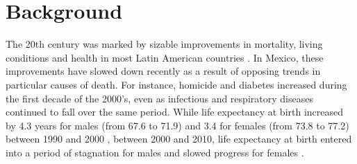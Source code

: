 \documentclass{bmcart}
\begin{document}
\begin{frontmatter}
\begin{abstractbox}

\begin{keyword}
\end{keyword}


\end{abstractbox}
%

\end{frontmatter}




\section*{Background}
The 20th century was marked by sizable improvements in mortality, living
conditions and health in most Latin American countries \cite{who2000}. 
In Mexico, these improvements have slowed down recently as a result of opposing
trends in particular causes of death. For instance, homicide and diabetes
increased during the first decade of the 2000's, even as infectious and
respiratory diseases continued to fall over the same period. While life
expectancy at birth increased by 4.3 years for males (from 67.6 to 71.9) and 3.4
for females (from 73.8 to 77.2) between 1990 and 2000 \cite{SOMEDE},
between 2000 and 2010, life expectancy at birth entered into a period of
stagnation for males and slowed progress for females \cite{canudas2014}. 
\end{document}
